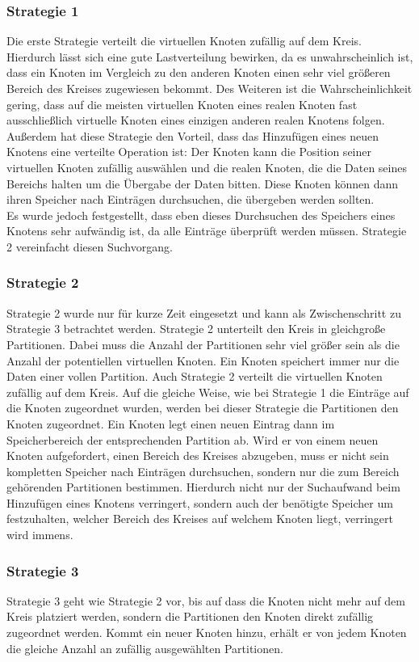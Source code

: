 \subsubsection*{Strategie 1}
Die erste Strategie verteilt die virtuellen Knoten zufällig auf dem Kreis. Hierdurch lässt sich eine gute Lastverteilung bewirken, da es unwahrscheinlich ist, dass ein Knoten im Vergleich zu den anderen Knoten einen sehr viel größeren Bereich des Kreises zugewiesen bekommt. Des Weiteren ist die Wahrscheinlichkeit gering, dass auf die meisten virtuellen Knoten eines realen Knoten fast ausschließlich virtuelle Knoten eines einzigen anderen realen Knotens folgen.\\
Außerdem hat diese Strategie den Vorteil, dass das Hinzufügen eines neuen Knotens eine verteilte Operation ist: Der Knoten kann die Position seiner virtuellen Knoten zufällig auswählen und die realen Knoten, die die Daten seines Bereichs halten um die Übergabe der Daten bitten. Diese Knoten können dann ihren Speicher nach Einträgen durchsuchen, die übergeben werden sollten.\\
Es wurde jedoch festgestellt, dass eben dieses Durchsuchen des Speichers eines Knotens sehr aufwändig ist, da alle Einträge überprüft werden müssen. Strategie 2 vereinfacht diesen Suchvorgang. 
\subsubsection*{Strategie 2}
Strategie 2 wurde nur für kurze Zeit eingesetzt und kann als Zwischenschritt zu Strategie 3 betrachtet werden. Strategie 2 unterteilt den Kreis in gleichgroße Partitionen. Dabei muss die Anzahl der Partitionen sehr viel größer sein als die Anzahl der potentiellen virtuellen Knoten. Ein Knoten speichert immer nur die Daten einer vollen Partition. Auch Strategie 2 verteilt die virtuellen Knoten zufällig auf dem Kreis. Auf die gleiche Weise, wie bei Strategie 1 die Einträge auf die Knoten zugeordnet wurden, werden bei dieser Strategie die Partitionen den Knoten zugeordnet. Ein Knoten legt einen neuen Eintrag dann im Speicherbereich der entsprechenden Partition ab. Wird er von einem neuen Knoten aufgefordert, einen Bereich des Kreises abzugeben, muss er nicht sein kompletten Speicher nach Einträgen durchsuchen, sondern nur die zum Bereich gehörenden Partitionen bestimmen. Hierdurch nicht nur der Suchaufwand beim Hinzufügen eines Knotens verringert, sondern auch der benötigte Speicher um festzuhalten, welcher Bereich des Kreises auf welchem Knoten liegt, verringert wird immens.
\subsubsection*{Strategie 3}
Strategie 3 geht wie Strategie 2 vor, bis auf dass die Knoten nicht mehr auf dem Kreis platziert werden, sondern die Partitionen den Knoten direkt zufällig zugeordnet werden. Kommt ein neuer Knoten hinzu, erhält er von jedem Knoten die gleiche Anzahl an zufällig ausgewählten Partitionen.
